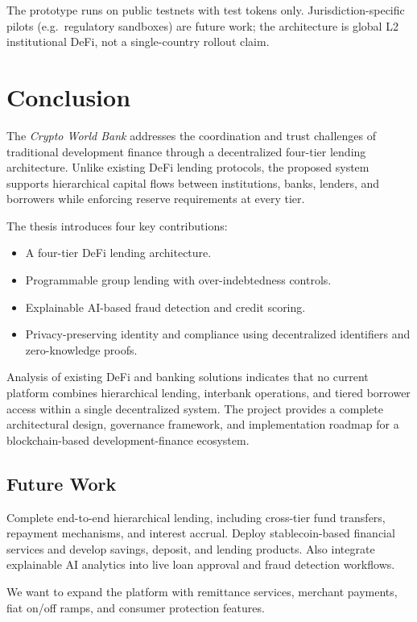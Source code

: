 \documentclass[12pt, a4paper]{report}
\begin{document}
The prototype runs on public testnets with test tokens only. Jurisdiction-specific pilots (e.g.\ regulatory sandboxes) are future work; the architecture is global L2 institutional DeFi, not a single-country rollout claim.

\chapter{Conclusion}

The \textit{Crypto World Bank} addresses the coordination and trust challenges of traditional development finance through a decentralized four-tier lending architecture. Unlike existing DeFi lending protocols, the proposed system supports hierarchical capital flows between institutions, banks, lenders, and borrowers while enforcing reserve requirements at every tier.

The thesis introduces four key contributions:
\begin{itemize}[noitemsep]
\item A four-tier DeFi lending architecture.
\item Programmable group lending with over-indebtedness controls.
\item Explainable AI-based fraud detection and credit scoring.
\item Privacy-preserving identity and compliance using decentralized identifiers and zero-knowledge proofs.
\end{itemize}

Analysis of existing DeFi and banking solutions indicates that no current platform combines hierarchical lending, interbank operations, and tiered borrower access within a single decentralized system. The project provides a complete architectural design, governance framework, and implementation roadmap for a blockchain-based development-finance ecosystem.

\section{Future Work}

Complete end-to-end hierarchical lending, including cross-tier fund transfers, repayment mechanisms, and interest accrual. Deploy stablecoin-based financial services and develop savings, deposit, and lending products. Also integrate explainable AI analytics into live loan approval and fraud detection workflows.

We want to expand the platform with remittance services, merchant payments, fiat on/off ramps, and consumer protection features.
\end{document}
